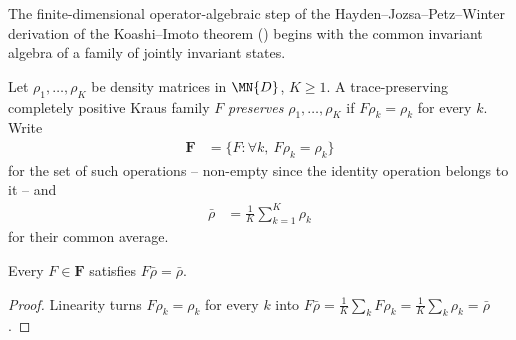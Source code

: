 The finite-dimensional operator-algebraic step of the
Hayden--Jozsa--Petz--Winter derivation of the Koashi--Imoto theorem
(\cite[Appendix~A]{Hayden2004Structure}) begins with the common invariant
algebra of a family of jointly invariant states.

\begin{definition}
    \label{def:koashi_imoto_preserving_average}
    \leanok
    Let $\rho_1,\ldots,\rho_K$ be density matrices in $\MN{D}$, $K\ge1$. A
    trace-preserving completely positive Kraus family $F$ \emph{preserves}
    $\rho_1,\ldots,\rho_K$ if $F\rho_k=\rho_k$ for every $k$. Write
    \begin{align}
        \mathbf F
        &=\{F:\forall k,\ F\rho_k=\rho_k\}
        \label{eq:koashi_imoto_preserving_set}
    \end{align}
    for the set of such operations -- non-empty since the identity operation
    belongs to it -- and
    \begin{align}
        \bar\rho
        &=\frac1K\sum_{k=1}^K\rho_k
        \label{eq:koashi_imoto_common_average}
    \end{align}
    for their common average.
\end{definition}

\begin{lemma}
    \label{lem:koashi_imoto_preserving_fixes_average}
    \leanok
    Every $F\in\mathbf F$ satisfies $F\bar\rho=\bar\rho$.
\end{lemma}

\begin{proof}
    \leanok
    Linearity turns $F\rho_k=\rho_k$ for every $k$ into
    $F\bar\rho=\frac1K\sum_kF\rho_k=\frac1K\sum_k\rho_k=\bar\rho$.
\end{proof}

